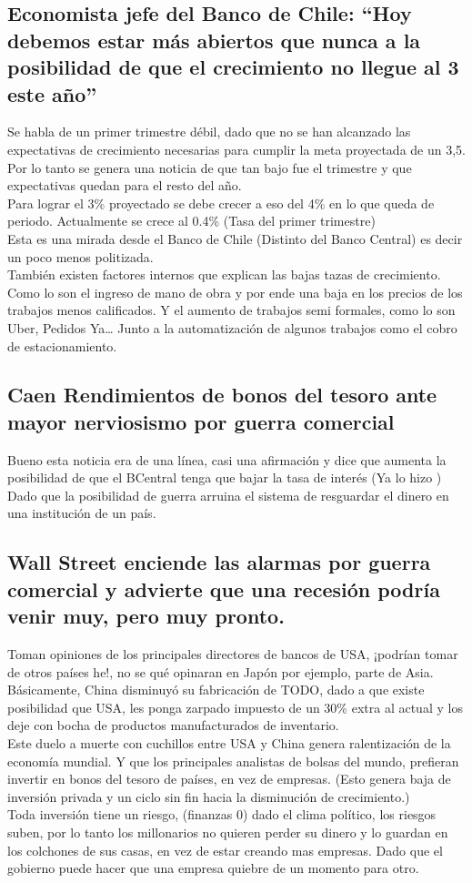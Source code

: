 \subsection{Economista jefe del Banco de Chile: “Hoy debemos estar más abiertos que nunca a la posibilidad de que el crecimiento no llegue al 3 este año”}
Se habla de un primer trimestre débil, dado que no se han alcanzado las expectativas de crecimiento necesarias para cumplir la meta proyectada de un 3,5.  Por lo tanto se genera una noticia de que tan bajo fue el trimestre y que expectativas quedan para el resto del año.
\\
Para lograr el 3\% proyectado se debe crecer a eso del 4\% en lo que queda de periodo. Actualmente se crece al 0.4\% (Tasa del primer trimestre)
\\
Esta es una mirada desde el Banco de Chile (Distinto del Banco Central) es decir un poco menos politizada. 
\\
También existen factores internos que explican las bajas tazas de crecimiento. Como lo son el ingreso de mano de obra y por ende una baja en los precios de los trabajos menos calificados. Y el aumento de trabajos semi formales, como lo son Uber, Pedidos Ya… Junto a la automatización de algunos trabajos como el cobro de estacionamiento. 
\subsection{Caen Rendimientos de bonos del tesoro ante mayor nerviosismo por guerra comercial}
Bueno esta noticia era de una línea, casi una afirmación y dice que aumenta la posibilidad de que el BCentral tenga que bajar la tasa de interés (Ya lo hizo ) Dado que la posibilidad de guerra arruina el sistema de resguardar el dinero en una institución de un país. 
\subsection{Wall Street enciende las alarmas por guerra comercial y advierte que una recesión podría venir muy, pero muy pronto. }
Toman opiniones de los principales directores de bancos de USA, ¡podrían tomar de otros países he!, no se qué opinaran en Japón por ejemplo, parte de Asia. Básicamente, China disminuyó su fabricación de TODO, dado a que existe posibilidad que USA, les ponga zarpado impuesto de un 30\% extra al actual y los deje con bocha de productos manufacturados de inventario.
\\
Este duelo a muerte con cuchillos entre USA y China genera ralentización de la economía mundial. Y que los principales analistas de bolsas del mundo, prefieran invertir en bonos del tesoro de países, en vez de empresas. (Esto genera baja de inversión privada y un ciclo sin fin hacia la disminución de crecimiento.)
\\
Toda inversión tiene un riesgo, (finanzas 0) dado el clima político, los riesgos suben, por lo tanto los millonarios no quieren perder su dinero y lo guardan en los colchones de sus casas, en vez de estar creando mas empresas. Dado que el gobierno puede hacer que una empresa quiebre de un momento para otro. 

